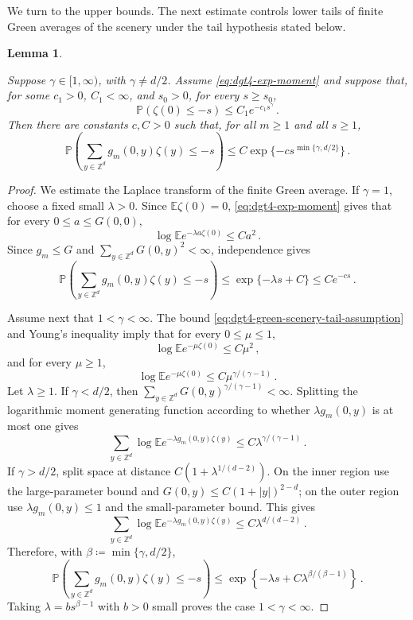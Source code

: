 \documentclass[11pt]{amsart}
\theoremstyle{plain}
\newtheorem{lemma}[theorem]{Lemma}
\theoremstyle{definition}
\newcommand{\Z}{\mathbb{Z}}
\newcommand{\E}{\mathbb{E}}
\renewcommand{\P}{\mathbb{P}}
\begin{document}
		We turn to the upper bounds. The next estimate controls lower tails of
		finite Green averages of the scenery under the tail hypothesis stated
		below.

		\begin{lemma}
		\label{lem:dgt4-stretched-green-scenery-tail}
		
			Suppose $\gamma\in[1,\infty)$, with $\gamma\ne d/2$. Assume
			\eqref{eq:dgt4-exp-moment} and suppose that, for some $c_1>0$,
			$C_1<\infty$, and $s_{0}>0$, for every $s\geq s_{0}$,
		    \begin{equation}\label{eq:dgt4-green-scenery-tail-assumption}
				\P(\zeta(0)\leq -s)\leq C_1e^{-c_1s^\gamma} \, .
			\end{equation}
			Then there are constants
			$c,C>0$ such that, for all $m\geq1$ and all $s\geq1$,
			\[
				\P\left(\sum_{y\in\Z^d}g_m(0,y)\zeta(y)\leq -s\right)
				\leq
				C\exp\{-c s^{\min\{\gamma,d/2\}}\} \, . 
			\]

		\end{lemma}

		\begin{proof}
			We estimate the Laplace transform of the finite Green average. If
			$\gamma=1$, choose a fixed small $\lambda>0$. Since $\E\zeta(0)=0$,
			\eqref{eq:dgt4-exp-moment} gives that for every $0\leq a\leq G(0,0)$,
				\[
					\log\E e^{-\lambda a\zeta(0)}\leq Ca^2\, .
				\]
			Since $g_m\leq G$ and
			$\sum_{y\in\Z^d}G(0,y)^2<\infty$, independence gives
			\[
					\P\left(\sum_{y\in\Z^d}g_m(0,y)\zeta(y)\leq -s\right)
					\leq
					\exp\{-\lambda s+C\}
					\leq Ce^{-cs}\, .
				\]

			Assume next that $1<\gamma<\infty$. The bound
			\eqref{eq:dgt4-green-scenery-tail-assumption} and Young's inequality imply that for every $0\leq \mu\leq 1$,
				\[
					\log\E e^{-\mu\zeta(0)}
					\leq C\mu^2\, ,
				\]
			and for every $\mu\geq 1$,
				\[
					\log\E e^{-\mu\zeta(0)}
					\leq C\mu^{\gamma/(\gamma-1)}\, .
				\]
			Let $\lambda\geq1$. If $\gamma<d/2$, then
			$\sum_{y\in\Z^d}G(0,y)^{\gamma/(\gamma-1)}<\infty$. Splitting the
			logarithmic moment generating function according to whether
			$\lambda g_m(0,y)$ is at most one gives
				\[
					\sum_{y\in\Z^d}\log\E e^{-\lambda g_m(0,y)\zeta(y)}
					\leq C\lambda^{\gamma/(\gamma-1)}\, .
				\]
			If $\gamma>d/2$, split space at distance
			$C(1+\lambda^{1/(d-2)})$. On the inner region use the large-parameter
			bound and $G(0,y)\leq C(1+|y|)^{2-d}$; on the outer region use
			$\lambda g_m(0,y)\leq1$ and the small-parameter bound. This gives
				\[
					\sum_{y\in\Z^d}\log\E e^{-\lambda g_m(0,y)\zeta(y)}
					\leq C\lambda^{d/(d-2)}\, .
				\]
			Therefore, with $\beta\coloneqq\min\{\gamma,d/2\}$,
			\[
					\P\left(\sum_{y\in\Z^d}g_m(0,y)\zeta(y)\leq -s\right)
					\leq
					\exp\left\{-\lambda s+C\lambda^{\beta/(\beta-1)}\right\}\, .
				\]
			Taking $\lambda=bs^{\beta-1}$ with $b>0$ small proves the case
			$1<\gamma<\infty$.
		\end{proof}
\end{document}
